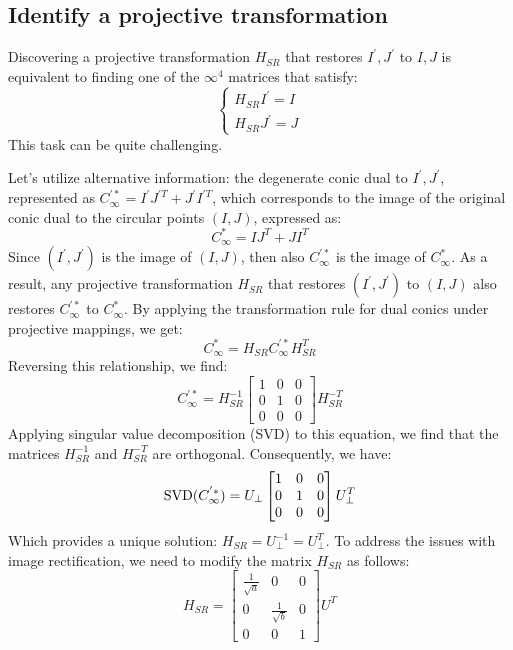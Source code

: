 \documentclass[12pt, a4paper]{report}
\begin{document}
    \subsection{Identify a projective transformation}
    Discovering a projective transformation $H_{SR}$ that restores $I^{'}, J^{'}$ to $I, J$ is equivalent to finding one of the $\infty^{4}$ matrices that satisfy:
    \[\begin{cases}
        H_{SR}I^{'}=I \\
        H_{SR}J^{'}=J
    \end{cases}\]
    This task can be quite challenging.
    
    Let's utilize alternative information: the degenerate conic dual to $I^{'},J^{'}$, represented as $C_{\infty}^{'*}=I^{'}J^{'T}+J^{'}I^{'T}$, which corresponds to the image of the original conic dual to the circular points $(I,J)$, expressed as: 
    \[C_{\infty}^{*}=IJ^{T}+JI^{T}\]
    Since $(I^{'},J^{'})$ is the image of $(I,J)$, then also $C_{\infty}^{'*}$ is the image of $C_{\infty}^{*}$. 
    As a result, any projective transformation $H_{SR}$ that restores $(I^{'},J^{'})$ to $(I,J)$ also restores $C_{\infty}^{'*}$ to $C_{\infty}^{*}$. 
    By applying the transformation rule for dual conics under projective mappings, we get:
    \[C^{*}_{\infty}=H_{SR}C^{'*}_{\infty}H_{SR}^T\]
    Reversing this relationship, we find:
    \[C_{\infty}^{'*}=H_{SR}^{-1} 
    \begin{bmatrix}
        1 & 0 & 0 \\
        0 & 1 & 0 \\
        0 & 0 & 0
    \end{bmatrix}
    H_{SR}^{-T}\]
    Applying singular value decomposition (SVD) to this equation, we find that the matrices $H_{SR}^{-1}$ and $H_{SR}^{-T}$ are orthogonal. 
    Consequently, we have:
    \[\textnormal{SVD}(C_{\infty}^{'*})=U_\perp
    \begin{bmatrix}
        1 & 0 & 0 \\
        0 & 1 & 0 \\
        0 & 0 & 0
    \end{bmatrix}
    U_{\perp}^T\]
    Which provides a unique solution: $H_{SR}=U_{\perp}^{-1}=U_{\perp}^T$. 
    To address the issues with image rectification, we need to modify the matrix $H_{SR}$ as follows:
    \[H_{SR}=
    \begin{bmatrix}
        \frac{1}{\sqrt{a}} & 0 & 0 \\
        0 & \frac{1}{\sqrt{b}} & 0 \\
        0 & 0 & 1
    \end{bmatrix}
    U^T
    \]
\end{document}
